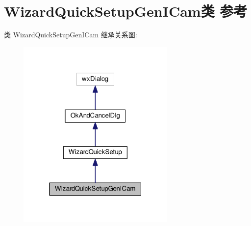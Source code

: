 \hypertarget{class_wizard_quick_setup_gen_i_cam}{\section{Wizard\+Quick\+Setup\+Gen\+I\+Cam类 参考}
\label{class_wizard_quick_setup_gen_i_cam}
}


类 Wizard\+Quick\+Setup\+Gen\+I\+Cam 继承关系图\+:
\nopagebreak
\begin{figure}[H]
\begin{center}
\leavevmode
\includegraphics[width=220pt]{class_wizard_quick_setup_gen_i_cam__inherit__graph}
\end{center}
\end{figure}


